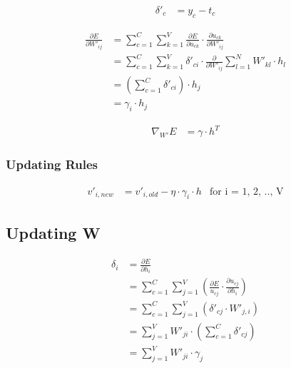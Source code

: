 \documentclass{article}
\begin{document}
	\begin{equation}
		\begin{aligned}
			\delta'_{c} &= y_{c} - t_{c} 
		\end{aligned}
	\end{equation}

	\begin{equation}
		\begin{aligned}
			\frac{\partial E}{\partial W'_{ij}} &= \sum_{c=1}^{C} \sum_{k=1}^{V} \frac{\partial E}{\partial u_{ck}} \cdot \frac{\partial u_{ck}}{\partial W'_{ij}} \\
			&= \sum_{c=1}^{C} \sum_{k=1}^{V} \delta'_{ci} \cdot \frac{\partial}{\partial W'_{ij}}\sum_{l=1}^{N} W'_{kl} \cdot h_l \\
			&= \left(\sum_{c=1}^{C} \delta'_{ci} \right)\cdot h_j \\
			&= \gamma_i \cdot h_j
		\end{aligned}	
	\end{equation}
	
	\begin{equation}
		\begin{aligned}
			\nabla_{W'} E &= \gamma \cdot h^T
		\end{aligned}	
	\end{equation}
	
	\subsubsection*{Updating Rules}
	\begin{framed}
	\begin{equation}
		\begin{aligned}
			v'_{i, new} &= v'_{i, old} - \eta \cdot \gamma_i \cdot h &\mbox{for i = 1, 2, .., V}
		\end{aligned}
	\end{equation}
	\end{framed}
	
	\subsection{Updating W}
	\begin{equation}
		\begin{aligned}
			\delta_i &= \frac{\partial E}{\partial h_i} \\
			&= \sum_{c=1}^{C}\sum_{j=1}^{V} \left( \frac{\partial E}{u_{cj}} \cdot \frac{\partial u_{cj}}{\partial h_i}\right)  \\
			&= \sum_{c=1}^{C}\sum_{j=1}^{V}\left( \delta'_{cj}\cdot W'_{j,i} \right)   \\
			&= \sum_{j=1}^{V} W'_{ji} \cdot \left(\sum_{c=1}^{C} \delta'_{cj} \right) \\
			&= \sum_{j=1}^{V} W'_{ji} \cdot \gamma_j
		\end{aligned}
	\end{equation}
	
\end{document}
